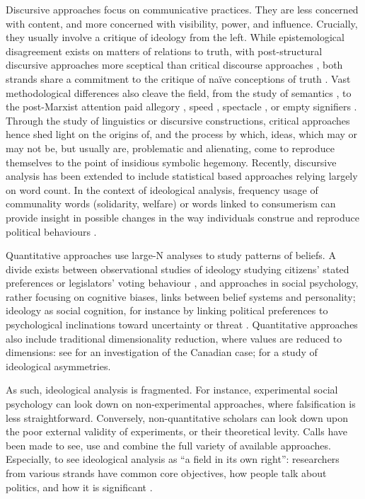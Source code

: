 \documentclass[
  openany]{book}
\begin{document}
Discursive approaches focus on communicative practices. They are less concerned with content, and more concerned with visibility, power, and influence. Crucially, they usually involve a critique of ideology from the left. While epistemological disagreement exists on matters of relations to truth, with post-structural discursive approaches \citep{mouffe1985hegemony, zivzek1989sublime} more sceptical than critical discourse approaches \citep{van2006ideology, fairclough1992discourse}, both strands share a commitment to the critique of naïve conceptions of truth \citep{kellner1989critical}. Vast methodological differences also cleave the field, from the study of semantics \citep{pecheux1975language}, to the post-Marxist attention paid allegory \citep{jameson2020allegory}, speed \citep{baudrillard1994simulacra} , spectacle \citep{debord2012society}, or empty signifiers \citep{laclau2007emancipation}. Through the study of linguistics or discursive constructions, critical approaches hence shed light on the origins of, and the process by which, ideas, which may or may not be, but usually are, problematic and alienating, come to reproduce themselves to the point of insidious symbolic hegemony. Recently, discursive analysis has been extended to include statistical based approaches \citep{nafstad2012ideology} relying largely on word count. In the context of ideological analysis, frequency usage of communality words (solidarity, welfare) or words linked to consumerism can provide insight in possible changes in the way individuals construe and reproduce political behaviours \citep{nafstad2012ideology}.

Quantitative approaches use large-N analyses to study patterns of beliefs. A divide exists between observational studies of ideology studying citizens' stated preferences \citep{bonica2013ideology} or legislators' voting behaviour \citep{martin2002dynamic}, and approaches in social psychology, rather focusing on cognitive biases, links between belief systems and personality; ideology as social cognition, for instance by linking political preferences to psychological inclinations toward uncertainty or threat \citep{jost2013political}. Quantitative approaches also include traditional dimensionality reduction, where values are reduced to dimensions: see \citet{heroux2016substate} for an investigation of the Canadian case; \citet{cochrane2010left} for a study of ideological asymmetries.

As such, ideological analysis is fragmented. For instance, experimental social psychology can look down on non-experimental approaches, where falsification is less straightforward. Conversely, non-quantitative scholars can look down upon the poor external validity of experiments, or their theoretical levity. Calls have been made to see, use and combine the full variety of available approaches. Especially, to see ideological analysis as ``a field in its own right'': researchers from various strands have common core objectives, how people talk about politics, and how it is significant \citep{maynard2013map}.
\end{document}
